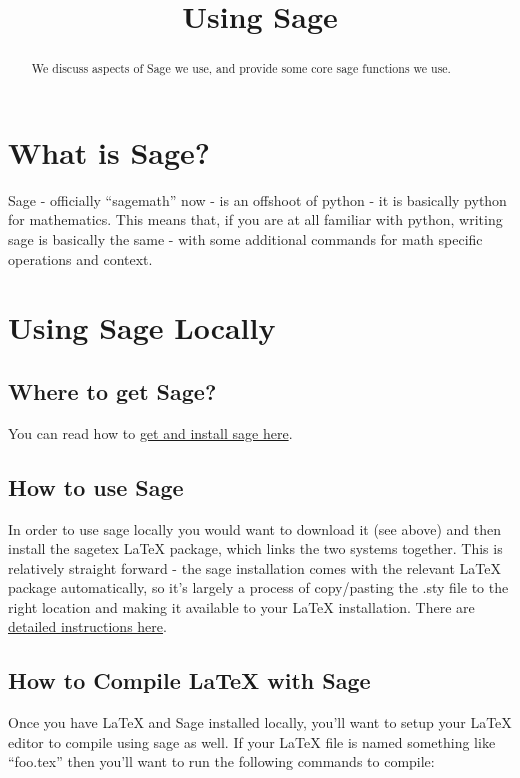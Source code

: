 \documentclass{ximera}
\title{Using Sage}
\begin{document}
\begin{abstract}
    We discuss aspects of Sage we use, and provide some core sage functions we use.
\end{abstract}
\maketitle

\section*{What is Sage?}
    Sage - officially ``sagemath'' now - is an offshoot of python - it is basically python for mathematics. This means that, if you are at all familiar with python, writing sage is basically the same - with some additional commands for math specific operations and context.

\section*{Using Sage Locally}
    \subsection{Where to get Sage?}
        You can read how to \href{https://www.sagemath.org/download.html}{get and install sage here}. 
    
    \subsection{How to use Sage}
        In order to use sage locally you would want to download it (see above) and then install the sagetex LaTeX package, which links the two systems together. This is relatively straight forward - the sage installation comes with the relevant LaTeX package automatically, so it's largely a process of copy/pasting the .sty file to the right location and making it available to your LaTeX installation. There are \href{https://doc.sagemath.org/html/en/reference/misc/sagetex.html}{detailed instructions here}.
    
    \subsection{How to Compile LaTeX with Sage}
        Once you have LaTeX and Sage installed locally, you'll want to setup your LaTeX editor to compile using sage as well. If your LaTeX file is named something like ``foo.tex'' then you'll want to run the following commands to compile:
        
\end{document}
